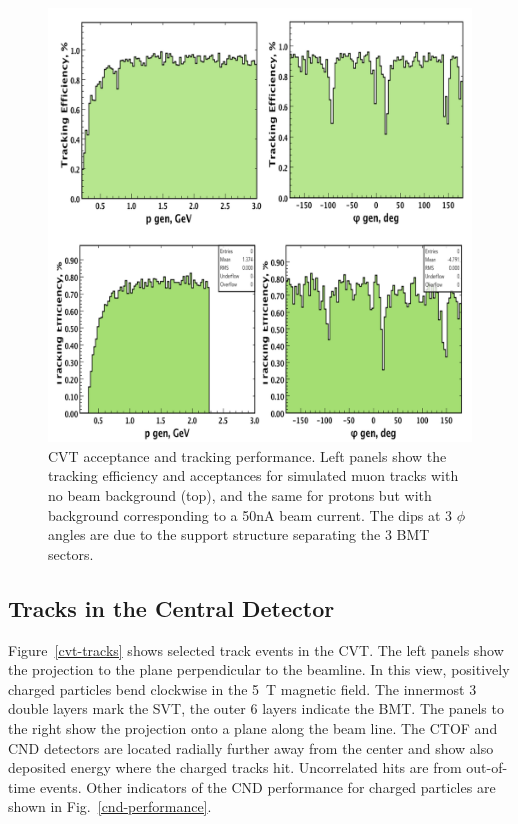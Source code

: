 \documentclass[final,3p,twocolumn]{elsarticle}
\begin{document}
\begin{figure}[thbp!]
\centerline{\includegraphics[width=1.0\columnwidth]{cvt-acceptance.png}}
\caption{CVT acceptance and tracking performance. Left panels show the tracking efficiency and acceptances for 
simulated muon tracks with no beam background (top), and the same for protons but with background corresponding to 
a 50nA beam current. The dips at 3 $\phi$ angles are due to the support structure separating the 3 BMT sectors.}
\label{cvt-acceptance}
\end{figure}



\subsection{Tracks in the Central Detector}
Figure~\ref{cvt-tracks} shows selected track events in the CVT. The left panels show the projection to the plane perpendicular to the beamline. In this view, positively charged particles bend clockwise in the 5~T magnetic field. The innermost 3 double layers mark the SVT, the outer 6 layers indicate the BMT. The panels to the right show the projection onto a plane along the beam line. The CTOF and CND detectors are located radially further away from the center and show also deposited energy where the charged tracks hit. Uncorrelated hits are from out-of-time events. Other indicators of the CND performance for charged particles are shown in Fig.~\ref{cnd-performance}.  
\end{document}
